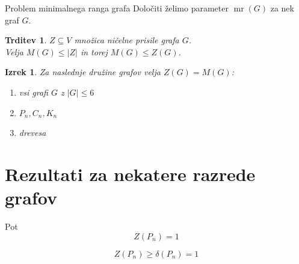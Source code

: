 \documentclass{beamer}
\newtheorem{trditev}[theorem]{Trditev}
\newtheorem{izrek}[theorem]{Izrek}
\DeclareMathOperator{\mr}{mr}
\begin{document}
\begin{frame}
    \begin{block}{Problem minimalnega ranga grafa}
        Določiti želimo parameter $\mr(G)$ za nek graf $G$.
    \end{block}
    
    \begin{trditev}
        $Z \subseteq V$ množica ničelne prisile grafa $G$. \\ 
        Velja $M(G) \leq |Z|$ in torej $M(G) \leq Z(G)$.
    \end{trditev}

    \begin{izrek}
        Za naslednje družine grafov velja $Z(G) = M(G)$:
        \begin{enumerate}
            \item vsi grafi $G$ z $|G| \leq 6$
            \item $P_n, C_n, K_n$
            \item drevesa
        \end{enumerate}
    \end{izrek}
\end{frame}


\section{Rezultati za nekatere razrede grafov}

\begin{frame}{Pot}
    \[ Z(P_n) = 1 \]
    \begin{figure}
        \centering
    \end{figure}
    
    \[ Z(P_n) \geq \delta(P_n) = 1 \]
\end{frame}
\end{document}
